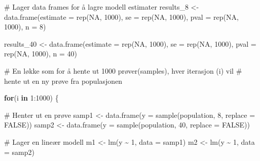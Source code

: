 \documentclass[
  letterpaper,
  DIV=11,
  numbers=noendperiod]{scrreprt}
\newenvironment{Shaded}{\begin{snugshade}}{\end{snugshade}}
\newcommand{\AttributeTok}[1]{\textcolor[rgb]{0.40,0.45,0.13}{#1}}
\newcommand{\CommentTok}[1]{\textcolor[rgb]{0.37,0.37,0.37}{#1}}
\newcommand{\ConstantTok}[1]{\textcolor[rgb]{0.56,0.35,0.01}{#1}}
\newcommand{\ControlFlowTok}[1]{\textcolor[rgb]{0.00,0.23,0.31}{\textbf{#1}}}
\newcommand{\DecValTok}[1]{\textcolor[rgb]{0.68,0.00,0.00}{#1}}
\newcommand{\FunctionTok}[1]{\textcolor[rgb]{0.28,0.35,0.67}{#1}}
\newcommand{\NormalTok}[1]{\textcolor[rgb]{0.00,0.23,0.31}{#1}}
\newcommand{\OtherTok}[1]{\textcolor[rgb]{0.00,0.23,0.31}{#1}}
\newcommand{\SpecialCharTok}[1]{\textcolor[rgb]{0.37,0.37,0.37}{#1}}
\begin{document}
\begin{Shaded}
\begin{Highlighting}[]
\CommentTok{\# Lager data frames for å lagre modell estimater}
\NormalTok{results\_8 }\OtherTok{\textless{}{-}} \FunctionTok{data.frame}\NormalTok{(}\AttributeTok{estimate =} \FunctionTok{rep}\NormalTok{(}\ConstantTok{NA}\NormalTok{, }\DecValTok{1000}\NormalTok{), }
                        \AttributeTok{se =} \FunctionTok{rep}\NormalTok{(}\ConstantTok{NA}\NormalTok{, }\DecValTok{1000}\NormalTok{), }
                        \AttributeTok{pval =} \FunctionTok{rep}\NormalTok{(}\ConstantTok{NA}\NormalTok{, }\DecValTok{1000}\NormalTok{), }
                        \AttributeTok{n =} \DecValTok{8}\NormalTok{)  }

\NormalTok{results\_40 }\OtherTok{\textless{}{-}} \FunctionTok{data.frame}\NormalTok{(}\AttributeTok{estimate =} \FunctionTok{rep}\NormalTok{(}\ConstantTok{NA}\NormalTok{, }\DecValTok{1000}\NormalTok{), }
                         \AttributeTok{se =} \FunctionTok{rep}\NormalTok{(}\ConstantTok{NA}\NormalTok{, }\DecValTok{1000}\NormalTok{), }
                         \AttributeTok{pval =} \FunctionTok{rep}\NormalTok{(}\ConstantTok{NA}\NormalTok{, }\DecValTok{1000}\NormalTok{), }
                         \AttributeTok{n =} \DecValTok{40}\NormalTok{)}

\CommentTok{\# En løkke som for å hente ut 1000 prøver(samples), hver iterasjon (i) vil }
\CommentTok{\# hente ut en ny prøve fra populasjonen}

\ControlFlowTok{for}\NormalTok{(i }\ControlFlowTok{in} \DecValTok{1}\SpecialCharTok{:}\DecValTok{1000}\NormalTok{) \{}
  
  \CommentTok{\# Henter ut en prøve }
\NormalTok{  samp1 }\OtherTok{\textless{}{-}} \FunctionTok{data.frame}\NormalTok{(}\AttributeTok{y =} \FunctionTok{sample}\NormalTok{(population, }\DecValTok{8}\NormalTok{, }\AttributeTok{replace =} \ConstantTok{FALSE}\NormalTok{))}
\NormalTok{  samp2 }\OtherTok{\textless{}{-}} \FunctionTok{data.frame}\NormalTok{(}\AttributeTok{y =} \FunctionTok{sample}\NormalTok{(population, }\DecValTok{40}\NormalTok{, }\AttributeTok{replace =} \ConstantTok{FALSE}\NormalTok{))}
  
  \CommentTok{\# Lager en lineær modell}
\NormalTok{  m1 }\OtherTok{\textless{}{-}} \FunctionTok{lm}\NormalTok{(y }\SpecialCharTok{\textasciitilde{}} \DecValTok{1}\NormalTok{, }\AttributeTok{data =}\NormalTok{ samp1)}
\NormalTok{  m2 }\OtherTok{\textless{}{-}} \FunctionTok{lm}\NormalTok{(y }\SpecialCharTok{\textasciitilde{}} \DecValTok{1}\NormalTok{, }\AttributeTok{data =}\NormalTok{ samp2)}
  

\end{Highlighting}
\end{Shaded}
\end{document}
